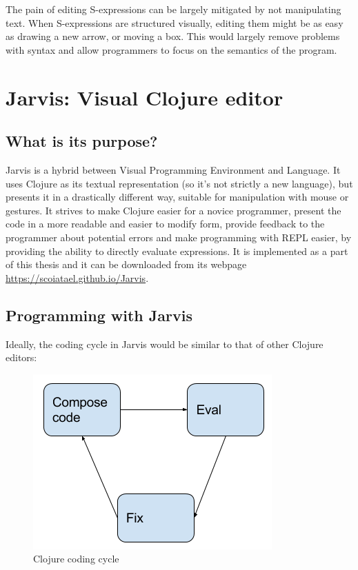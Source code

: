 \documentclass[11pt]{scrartcl}
\begin{document}
The pain of editing S-expressions can be largely mitigated by not manipulating text. When S-expressions are structured visually, editing them might be as easy as drawing a new arrow, or moving a box. This would largely remove problems with syntax and allow programmers to focus on the semantics of the program.

\section{Jarvis: Visual Clojure editor}
\subsection{What is its purpose?}
Jarvis is a hybrid between Visual Programming Environment and Language. It uses Clojure as its textual representation (so it’s not strictly a new language), but presents it in a drastically different way, suitable for manipulation with mouse or gestures. It strives to make Clojure easier for a novice programmer, present the code in a more readable and easier to modify form, provide feedback to the programmer about potential errors and make programming with REPL easier, by providing the ability to directly evaluate expressions. It is implemented as a part of this thesis and it can be downloaded from its webpage \url{https://scoiatael.github.io/Jarvis}.
\subsection{Programming with Jarvis}
Ideally, the coding cycle in Jarvis would be similar to that of other Clojure editors:
\begin{figure}[hbt]
  \includegraphics[scale=0.5]{img/Programming.png}
  \caption{Clojure coding cycle}
\end{figure}
\end{document}
